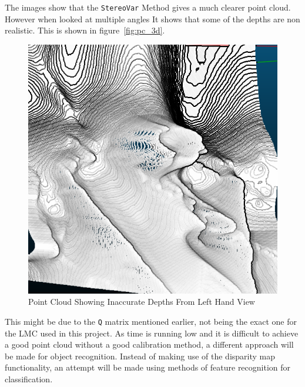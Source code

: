 \documentclass[11pt,oneside]{report}
\newcommand\code[1]{\texttt{#1}}
\begin{document}
			The images show that the \code{StereoVar} Method gives a much clearer point cloud.
			However when looked at multiple angles It shows that some of the depths are non realistic.
			This is shown in figure~\ref{fig:pc_3d}.
			\begin{figure}
			\centering
    				\includegraphics[width=\textwidth]{pc_3d_angle}
    			\caption{Point Cloud Showing Inaccurate Depths From Left Hand View \protect {\label{fig:pc_3d}}}

			\end{figure}	
			This might be due to the \code{Q} matrix mentioned earlier, not being the exact one for the LMC used in this project.
			As time is running low and it is difficult to achieve a good point cloud without a good calibration method, a different approach will be made for object recognition.
			Instead of making use of the disparity map functionality, an attempt will be made using methods of feature recognition for classification.
\end{document}
